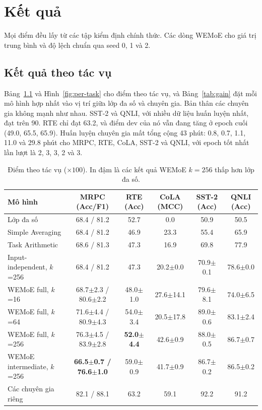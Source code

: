 \chapter{Kết quả}
\label{ch:results}

Mọi điểm đều lấy từ các tập kiểm định chính thức. Các dòng WEMoE cho giá trị trung bình và độ lệch chuẩn qua seed 0, 1 và 2.

\section{Kết quả theo tác vụ}

Bảng~\ref{tab:per-task} và Hình~\ref{fig:per-task} cho điểm theo tác vụ, và Bảng~\ref{tab:gain} đặt mỗi mô hình hợp nhất vào vị trí giữa lớp đa số và chuyên gia. Bản thân các chuyên gia không mạnh như nhau. SST-2 và QNLI, với nhiều dữ liệu huấn luyện nhất, đạt trên 90. RTE chỉ đạt 63.2, và điểm dev của nó vẫn đang tăng ở epoch cuối (49.0, 65.5, 65.9). Huấn luyện chuyên gia mất tổng cộng 43 phút: 0.8, 0.7, 1.1, 11.0 và 29.8 phút cho MRPC, RTE, CoLA, SST-2 và QNLI, với epoch tốt nhất lần lượt là 2, 3, 3, 2 và 3.

\begin{table}[htbp]
  \centering\tablestyle
  \caption{Điểm theo tác vụ ($\times100$). In đậm là các kết quả WEMoE $k=256$ thấp hơn lớp đa số.}
  \label{tab:per-task}
  \setlength{\tabcolsep}{3pt}\begin{tabular}{l c c c c c}
    \toprule
    Mô hình & MRPC (Acc/F1) & RTE (Acc) & CoLA (MCC) & SST-2 (Acc) & QNLI (Acc)\\
    \midrule
    Lớp đa số & 68.4 / 81.2 & 52.7 & 0.0 & 50.9 & 50.5\\
    Simple Averaging & 68.4 / 81.2 & 46.9 & 23.3 & 55.4 & 65.9\\
    Task Arithmetic & 68.6 / 81.3 & 47.3 & 16.9 & 69.8 & 77.9\\
    Input-independent, $k$=256 & 68.4 / 81.2 & 47.3 & 20.2$\pm$0.0 & 70.9$\pm$0.1 & 78.6$\pm$0.0\\
    WEMoE full, $k$=16 & 68.7$\pm$2.3 / 80.6$\pm$2.2 & 48.0$\pm$1.0 & 27.6$\pm$14.1 & 79.6$\pm$8.1 & 74.0$\pm$6.5\\
    WEMoE full, $k$=64 & 71.6$\pm$4.4 / 80.9$\pm$4.3 & 54.0$\pm$3.4 & 20.5$\pm$17.8 & 89.0$\pm$0.6 & 83.1$\pm$2.4\\
    WEMoE full, $k$=256 & 76.3$\pm$4.5 / 83.9$\pm$2.8 & \textbf{52.0$\pm$4.4} & 42.6$\pm$0.9 & 88.0$\pm$0.5 & 86.7$\pm$0.7\\
    WEMoE intermediate, $k$=256 & \textbf{66.5$\pm$0.7 / 76.6$\pm$1.0} & 59.0$\pm$0.9 & 41.7$\pm$0.9 & 86.7$\pm$0.2 & 86.5$\pm$0.2\\
    Các chuyên gia riêng & 82.1 / 88.1 & 63.2 & 59.1 & 92.2 & 91.2\\
    \bottomrule
  \end{tabular}
\end{table}

